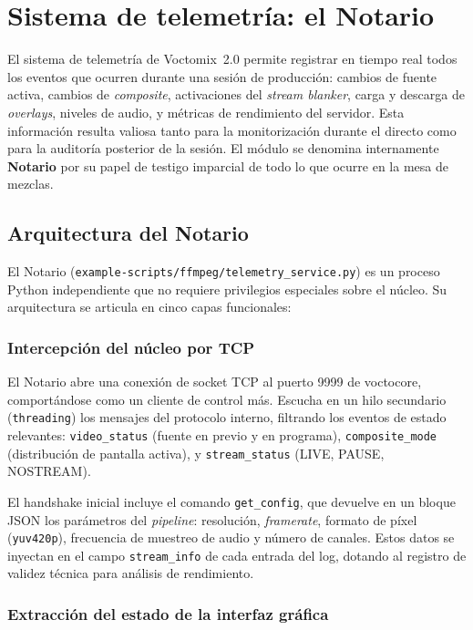 \section{Sistema de telemetría: el Notario}
\label{sec:telemetria}

El sistema de telemetría de Voctomix~2.0 permite registrar en tiempo real todos los
eventos que ocurren durante una sesión de producción: cambios de fuente activa, cambios
de \textit{composite}, activaciones del \textit{stream blanker}, carga y descarga de \textit{overlays}, niveles de
audio, y métricas de rendimiento del servidor. Esta información resulta valiosa tanto
para la monitorización durante el directo como para la auditoría posterior de la sesión.
El módulo se denomina internamente \textbf{Notario} por su papel de testigo imparcial
de todo lo que ocurre en la mesa de mezclas.

\subsection{Arquitectura del Notario}

El Notario (\texttt{example-scripts/ffmpeg/telemetry\_service.py}) es un proceso Python
independiente que no requiere privilegios especiales sobre el núcleo. Su arquitectura se
articula en cinco capas funcionales:

\subsubsection{Intercepción del núcleo por TCP}

El Notario abre una conexión de socket TCP al puerto 9999 de voctocore, comportándose
como un cliente de control más. Escucha en un hilo secundario (\texttt{threading}) los
mensajes del protocolo interno, filtrando los eventos de estado relevantes:
\texttt{video\_status} (fuente en previo y en programa), \texttt{composite\_mode}
(distribución de pantalla activa), y \texttt{stream\_status} (LIVE, PAUSE, NOSTREAM).

El handshake inicial incluye el comando \texttt{get\_config}, que devuelve en un bloque
JSON los parámetros del \textit{pipeline}: resolución, \textit{framerate}, formato de píxel
(\texttt{yuv420p}), frecuencia de muestreo de audio y número de canales. Estos datos
se inyectan en el campo \texttt{stream\_info} de cada entrada del log, dotando al
registro de validez técnica para análisis de rendimiento.

\subsubsection{Extracción del estado de la interfaz gráfica}

